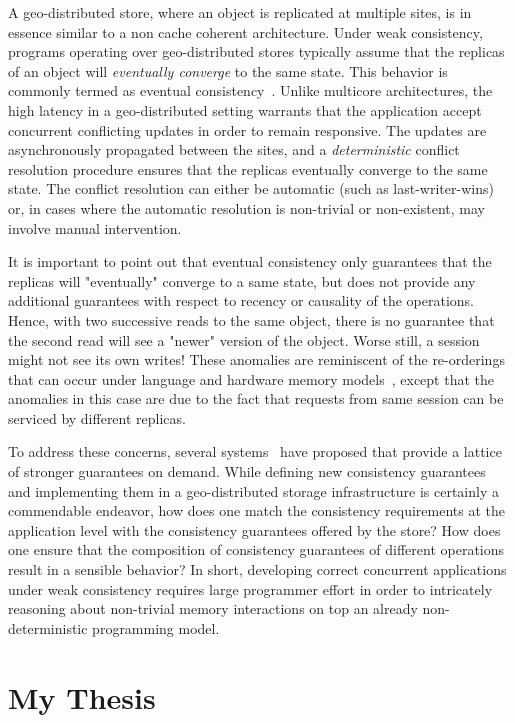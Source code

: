 A geo-distributed store, where an object is replicated at multiple sites, is in
essence similar to a non cache coherent architecture. Under weak consistency,
programs operating over geo-distributed stores typically assume that the
replicas of an object will \emph{eventually converge} to the same state. This
behavior is commonly termed as eventual
consistency~\cite{Terry1995,Bailis2013}. Unlike multicore architectures, the
high latency in a geo-distributed setting warrants that the application accept
concurrent conflicting updates in order to remain responsive. The updates are
asynchronously propagated between the sites, and a \emph{deterministic}
conflict resolution procedure ensures that the replicas eventually converge to
the same state. The conflict resolution can either be automatic (such as
last-writer-wins) or, in cases where the automatic resolution is non-trivial or
non-existent, may involve manual intervention.

It is important to point out that eventual consistency only guarantees that the
replicas will "eventually" converge to a same state, but does not provide any
additional guarantees with respect to recency or causality of the operations.
Hence, with two successive reads to the same object, there is no guarantee that
the second read will see a "newer" version of the object. Worse still, a
session might not see its own writes! These anomalies are reminiscent of the
re-orderings that can occur under language and hardware memory
models~\cite{Demange2013,Sewell2010}, except that the anomalies in this case
are due to the fact that requests from same session can be serviced by
different replicas.

To address these concerns, several systems~\cite{COPS, Eiger, Walter, Li2012,
HAT} have proposed that provide a lattice of stronger guarantees on demand.
While defining new consistency guarantees and implementing them in a
geo-distributed storage infrastructure is certainly a commendable endeavor,
how does one match the consistency requirements at the application level with
the consistency guarantees offered by the store? How does one ensure that the
composition of consistency guarantees of different operations result in a
sensible behavior? In short, developing correct concurrent applications under
weak consistency requires large programmer effort in order to intricately
reasoning about non-trivial memory interactions on top an already
non-deterministic programming model.

\section{My Thesis}

